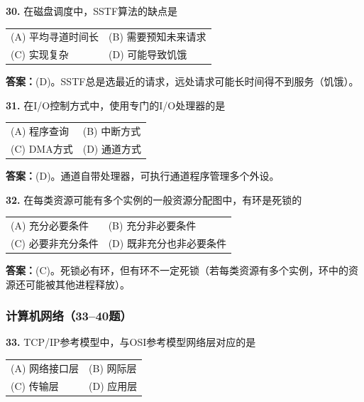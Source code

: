 \noindent\textbf{30.} 在磁盘调度中，SSTF算法的缺点是
\begin{center}
\begin{tabular}{ll}
(A) 平均寻道时间长 & (B) 需要预知未来请求 \\[6pt]
(C) 实现复杂 & (D) 可能导致饥饿
\end{tabular}
\end{center}

\ifshowsolutions\par\noindent\textbf{答案：}(D)。SSTF总是选最近的请求，远处请求可能长时间得不到服务（饥饿）。\else \answerarea \fi

\vspace{6pt}

\noindent\textbf{31.} 在I/O控制方式中，使用专门的I/O处理器的是
\begin{center}
\begin{tabular}{ll}
(A) 程序查询 & (B) 中断方式 \\[6pt]
(C) DMA方式 & (D) 通道方式
\end{tabular}
\end{center}

\ifshowsolutions\par\noindent\textbf{答案：}(D)。通道自带处理器，可执行通道程序管理多个外设。\else \answerarea \fi

\vspace{6pt}

\noindent\textbf{32.} 在每类资源可能有多个实例的一般资源分配图中，有环是死锁的
\begin{center}
\begin{tabular}{ll}
(A) 充分必要条件 & (B) 充分非必要条件 \\[6pt]
(C) 必要非充分条件 & (D) 既非充分也非必要条件
\end{tabular}
\end{center}

\ifshowsolutions\par\noindent\textbf{答案：}(C)。死锁必有环，但有环不一定死锁（若每类资源有多个实例，环中的资源还可能被其他进程释放）。\else \answerarea \fi

\subsubsection*{计算机网络（33--40题）}

\noindent\textbf{33.} TCP/IP参考模型中，与OSI参考模型网络层对应的是
\begin{center}
\begin{tabular}{ll}
(A) 网络接口层 & (B) 网际层 \\[6pt]
(C) 传输层 & (D) 应用层
\end{tabular}
\end{center}

